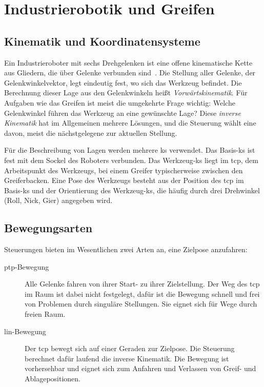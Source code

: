 \section{Industrierobotik und Greifen}
\label{sec:robotik}

\subsection{Kinematik und Koordinatensysteme}

Ein Industrieroboter mit sechs Drehgelenken ist eine offene kinematische Kette aus Gliedern,
die über Gelenke verbunden sind~\cite{siciliano2016}. Die Stellung aller Gelenke, der
Gelenkwinkelvektor, legt eindeutig fest, wo sich das Werkzeug befindet. Die Berechnung dieser
Lage aus den Gelenkwinkeln heißt \emph{Vorwärtskinematik}. Für Aufgaben wie das Greifen ist
meist die umgekehrte Frage wichtig: Welche Gelenkwinkel führen das Werkzeug an eine gewünschte
Lage? Diese \emph{inverse Kinematik} hat im Allgemeinen mehrere Lösungen, und die Steuerung
wählt eine davon, meist die nächstgelegene zur aktuellen Stellung.

Für die Beschreibung von Lagen werden mehrere \ac{ks} verwendet. Das Basis-\ac{ks} ist fest
mit dem Sockel des Roboters verbunden. Das Werkzeug-\ac{ks} liegt im \ac{tcp}, dem
Arbeitspunkt des Werkzeugs, bei einem Greifer typischerweise zwischen den Greiferbacken.
Eine Pose des Werkzeugs besteht aus der Position des \ac{tcp} im Basis-\ac{ks} und der
Orientierung des Werkzeug-\ac{ks}, die häufig durch drei Drehwinkel (Roll, Nick, Gier)
angegeben wird.

\subsection{Bewegungsarten}

Steuerungen bieten im Wesentlichen zwei Arten an, eine Zielpose anzufahren:
\begin{description}
  \item[\ac{ptp}-Bewegung] Alle Gelenke fahren von ihrer Start- zu ihrer Zielstellung. Der Weg
    des \ac{tcp} im Raum ist dabei nicht festgelegt, dafür ist die Bewegung schnell und frei
    von Problemen durch singuläre Stellungen. Sie eignet sich für Wege durch freien Raum.
  \item[\ac{lin}-Bewegung] Der \ac{tcp} bewegt sich auf einer Geraden zur Zielpose. Die
    Steuerung berechnet dafür laufend die inverse Kinematik. Die Bewegung ist vorhersehbar
    und eignet sich zum Anfahren und Verlassen von Greif- und Ablagepositionen.
\end{description}

